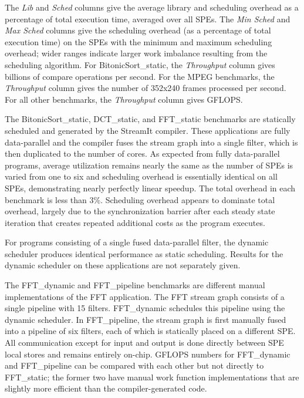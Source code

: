 The \emph{Lib} and \emph{Sched} columns give the average library and scheduling overhead
as a percentage of total execution time, averaged over all SPEs.
The \emph{Min Sched} and \emph{Max Sched} columns give the scheduling overhead
(as a percentage of total execution time) on the SPEs with the minimum and maximum
scheduling overhead; wider ranges indicate larger work imbalance
resulting from the scheduling algorithm.
For \textsf{BitonicSort\_static}, the \emph{Throughput} column gives
billions of compare operations per second. For the MPEG benchmarks,
the \emph{Throughput} column gives the number of 352x240 frames processed per second.
For all other benchmarks, the \emph{Throughput} column gives GFLOPS.

The \textsf{BitonicSort\_static}, \textsf{DCT\_static}, and \textsf{FFT\_static} benchmarks
are statically scheduled and generated by the StreamIt compiler.
These applications are fully data-parallel and the compiler fuses the stream graph
into a single filter, which is then duplicated to the number of cores.
As expected from fully data-parallel programs, average utilization remains nearly the same
as the number of SPEs is varied from one to six and scheduling overhead is essentially identical
on all SPEs, demonstrating nearly perfectly linear speedup.
The total overhead in each benchmark is less than 3\%. Scheduling overhead appears
to dominate total overhead, largely due to the synchronization barrier after each steady state
iteration that creates repeated additional costs as the program executes.

For programs consisting of a single fused data-parallel filter, the dynamic scheduler produces identical performance as static scheduling. Results for the dynamic scheduler on these applications are not separately given.

The \textsf{FFT\_dynamic} and \textsf{FFT\_pipeline} benchmarks are different manual implementations of the FFT application. The FFT stream graph consists of a single pipeline with 15 filters. \textsf{FFT\_dynamic} schedules this pipeline using the dynamic scheduler. In \textsf{FFT\_pipeline}, the stream graph is first manually fused into a pipeline of six filters, each of which is statically placed on a different SPE. All communication except for input and output is done directly between SPE local stores and remains entirely on-chip. GFLOPS numbers for \textsf{FFT\_dynamic} and \textsf{FFT\_pipeline} can be compared with each other but not directly to \textsf{FFT\_static}; the former two have manual work function implementations that are slightly more efficient than the compiler-generated code.

